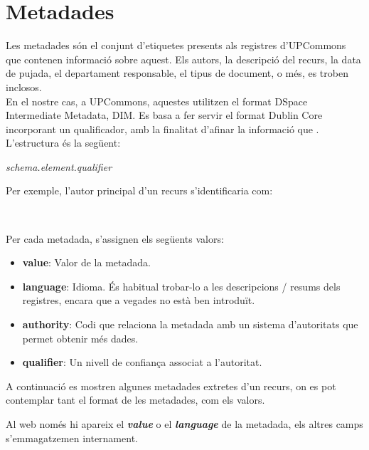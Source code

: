\section{Metadades}\label{sec:metadata-processing}

Les metadades són el conjunt d'etiquetes presents als registres d'\gls{UPCommons} que contenen informació sobre aquest.
Els autors, la descripció del recurs, la data de pujada, el departament responsable, el tipus de document, o més, es troben inclosos. \\

\noindent
En el nostre cas, a \gls{UPCommons}, aquestes utilitzen el format \gls{DSpace} Intermediate Metadata, \gls{DIM}.
Es basa a fer servir el format Dublin Core incorporant un qualificador, amb la finalitat d'afinar la informació que .
L'estructura és la següent:

\begin{center}
    \textit{schema.element.qualifier} \\
\end{center}

\noindent
Per exemple, l'autor principal d'un recurs s'identificaria com:

\begin{center}
     \\
\end{center}

\noindent
Per cada metadada, s'assignen els següents valors:

\begin{itemize}
    \item \textbf{value}: Valor de la metadada.
    \item \textbf{language}: Idioma.
    És habitual trobar-lo a les descripcions / resums dels registres, encara que a vegades no està ben introduït.
    \item \textbf{authority}: Codi que relaciona la metadada amb un sistema d'autoritats que permet obtenir més dades.
    \item \textbf{qualifier}: Un nivell de confiança associat a l'autoritat.
\end{itemize}

\clearpage

\noindent
A continuació es mostren algunes metadades extretes d'un recurs, on es pot contemplar tant el format de les metadades, com els valors. \\

\begin{tcolorbox}[colback=green!5!white, colframe=green!50!black, title=Metadades]
    Al web només hi apareix el \textbf{\textit{value}} o el \textbf{\textit{language}} de la metadada, els altres camps s'emmagatzemen internament.
\end{tcolorbox}


